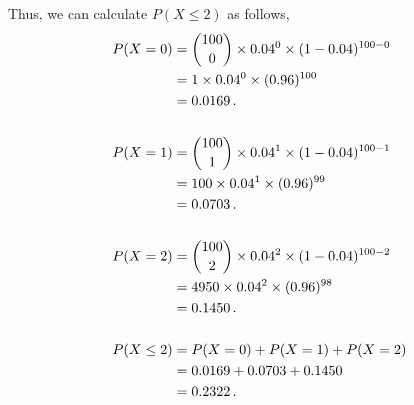 \begin{subquestions}
\begin{subsubquestions}
Thus, we can calculate $P(X\leq 2)$ as follows,
\begin{align}
	P(X = 0) & = { 100 \choose 0} \times 0.04^0 \times (1-0.04)^{100-0} \nonumber \\
             & = 1 \times 0.04^0 \times (0.96)^{100} \nonumber \\
	         & = 0.0169 \,. \\ \nonumber \\
	P(X = 1) & = { 100 \choose 1} \times 0.04^1 \times (1-0.04)^{100-1} \nonumber \\
			 & = 100 \times 0.04^1 \times (0.96)^{99} \nonumber \\
			 & = 0.0703 \,. \\ \nonumber \\	 
	P(X = 2) & = { 100 \choose 2} \times 0.04^2 \times (1-0.04)^{100-2} \nonumber \\
			 & = 4950 \times 0.04^2 \times (0.96)^{98} \nonumber \\
			 & = 0.1450 \,. \\ \nonumber \\
	P(X \leq 2) & = P(X=0)+P(X=1)+P(X=2) \nonumber \\
	            & = 0.0169+0.0703+0.1450 \nonumber \\
	            & = 0.2322 \,.		 
\end{align}

\end{subsubquestions}

\end{subquestions}